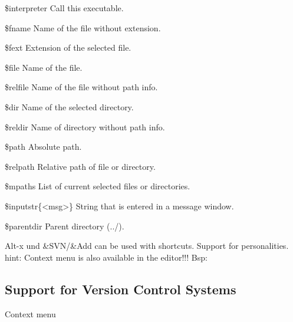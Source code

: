 %
\begin{codeentry}
\item[\$interpreter] Call this executable.%
\item[\$fname] Name of the file without extension. %
\item[\$fext] Extension of the selected file. %
\item[\$file] Name of the file. %
\item[\$relfile] Name of the file without path info. %
\item[\$dir] Name of the selected directory. %
\item[\$reldir] Name of directory without path info. %
\item[\$path] Absolute path. %
\item[\$relpath] Relative path of file or directory. %
\item[\$mpaths] List of current selected files or directories. %
\item[\$inputstr\{<msg>\}] String that is entered in a message window. %
\item[\$parentdir] Parent directory (../). %
\end{codeentry}

Alt-x und \&SVN/\&Add can be used with shortcuts.
Support for personalities.
hint: Context menu is also available in the editor!!!
Bsp:

\subsection{Support for Version Control Systems}

Context menu 
%
%
%

